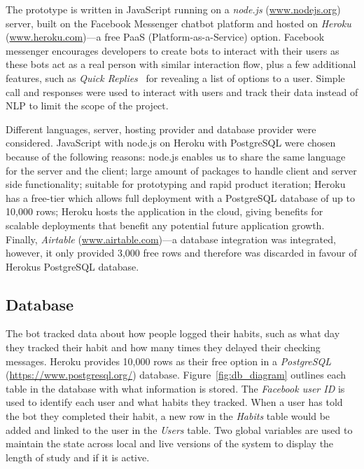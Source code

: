 The prototype is written in JavaScript running on a \textit{node.js} (\url{www.nodejs.org}) server, built on the Facebook Messenger chatbot platform and hosted on \textit{Heroku} (\url{www.heroku.com})---a free PaaS (Platform-as-a-Service) option. Facebook messenger encourages developers to create bots to interact with their users as these bots act as a real person with similar interaction flow, plus a few additional features, such as \textit{Quick Replies}~\cite{doc_fb_quick_replies} for revealing a list of options to a user. Simple call and responses were used to interact with users and track their data instead of NLP to limit the scope of the project.


Different languages, server, hosting provider and database provider were considered. JavaScript with node.js on Heroku with PostgreSQL were chosen because of the following reasons: node.js enables us to share the same language for the server and the client; large amount of packages to handle client and server side functionality; suitable for prototyping and rapid product iteration; Heroku has a free-tier which allows full deployment with a PostgreSQL database of up to 10,000 rows; Heroku hosts the application in the cloud, giving benefits for scalable deployments that benefit any potential future application growth. Finally, \textit{Airtable} (\url{www.airtable.com})---a database integration was integrated, however, it only provided 3,000 free rows and therefore was discarded in favour of Herokus PostgreSQL database.


\subsection{Database}
The bot tracked data about how people logged their habits, such as what day they tracked their habit and how many times they delayed their checking messages. Heroku provides 10,000 rows as their free option in a \textit{PostgreSQL} (\url{https://www.postgresql.org/}) database. Figure~\ref{fig:db_diagram} outlines each table in the database with what information is stored. The \textit{Facebook user ID} is used to identify each user and what habits they tracked. When a user has told the bot they completed their habit, a new row in the \textit{Habits} table would be added and linked to the user in the \textit{Users} table. Two global variables are used to maintain the state across local and live versions of the system to display the length of study and if it is active.

